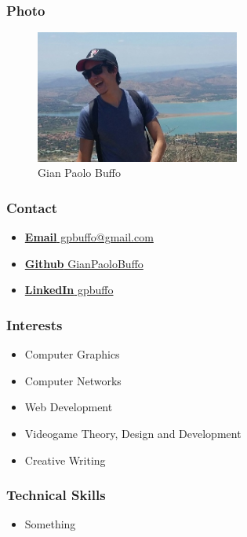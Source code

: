 \documentclass{article}
\begin{document}
	\subsubsection{Photo}
		\begin{figure}[H]
			\centering
			\includegraphics[width=0.6\textwidth]{../gianpaolo.jpg}
			\caption{Gian Paolo Buffo}
		\end{figure}
	\subsubsection{Contact}
		\begin{itemize}
			\item \href{mailto:gpbuffo@gmail.com}
				{\textbf{Email} gpbuffo@gmail.com}
			\item \href{https://github.com/GianPaoloBuffo}
				{\textbf{Github} GianPaoloBuffo}
			\item \href{https://www.linkedin.com/in/gpbuffo}
				{\textbf{LinkedIn} gpbuffo}
		\end{itemize}
	\subsubsection{Interests}
		\begin{itemize}
			\item Computer Graphics
			\item Computer Networks
			\item Web Development
			\item Videogame Theory, Design and Development
			\item Creative Writing
		\end{itemize}
	\subsubsection{Technical Skills}
		\begin{itemize}
			\item Something
		\end{itemize}
\end{document}
